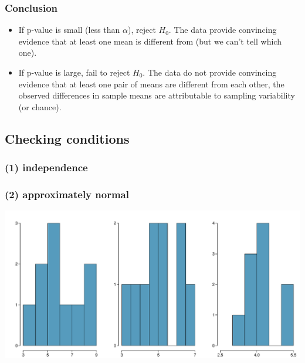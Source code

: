 
\begin{frame}
\frametitle{Conclusion}

\begin{itemize}

\item  If p-value is small (less than $\alpha$), reject $H_0$. The data provide convincing evidence that at least one mean is different from (but we can't tell which one).

\pause

\item If p-value is large, fail to reject $H_0$. The data do not provide convincing evidence that at least one pair of means are different from each other, the observed differences in sample means are attributable to sampling variability (or chance).

\end{itemize}

\end{frame}


\subsection{Checking conditions}


\begin{frame}[fragile]
\frametitle{(1) independence}



\end{frame}


\begin{frame}[fragile]
\frametitle{(2) approximately normal}


\begin{center}
\includegraphics[width=\textwidth]{7-5_anova/figures/aldrin/normal}
\end{center}

\end{frame}

